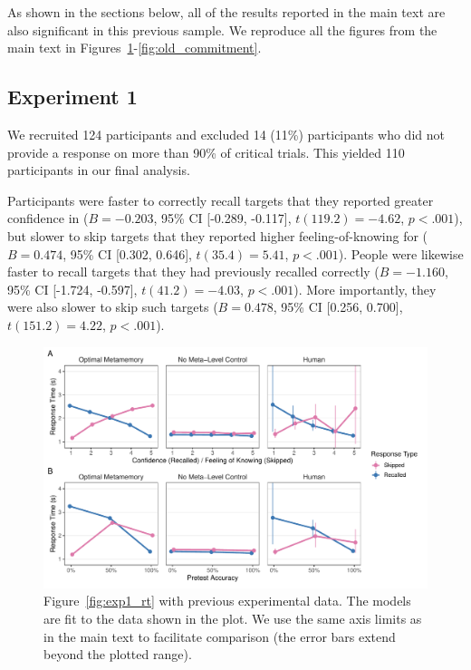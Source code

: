 As shown in the sections below, all of the results reported in the main text are also significant in this previous sample. We reproduce all the figures from the main text in Figures~\ref{fig:old_exp1_rt}-\ref{fig:old_commitment}.

\subsection{Experiment 1}

We recruited 124 participants and excluded 14 (11\%) participants who did not provide a response on more than 90\% of critical trials. This yielded 110 participants in our final analysis.

Participants were faster to correctly recall targets that they reported greater confidence in ($B = -0.203$, 95\% CI [-0.289, -0.117], $t(119.2)=-4.62$, $p < .001$), but slower to skip targets that they reported higher feeling-of-knowing for ($B = 0.474$, 95\% CI [0.302, 0.646], $t(35.4)=5.41$, $p < .001$). People were likewise faster to recall targets that they had previously recalled correctly ($B = -1.160$, 95\% CI [-1.724, -0.597], $t(41.2)=-4.03$, $p < .001$). More importantly, they were also slower to skip such targets ($B = 0.478$, 95\% CI [0.256, 0.700], $t(151.2)=4.22$, $p < .001$).

\begin{figure}[ht]
  \includegraphics[scale=.75]{figs/memory/old_exp1/rt.pdf}
  \caption{Figure~\ref{fig:exp1_rt} with previous experimental data. The models are fit to the data shown in the plot. We use the same axis limits as in the main text to facilitate comparison (the error bars extend beyond the plotted range).
  }
  \label{fig:old_exp1_rt}
\end{figure}


